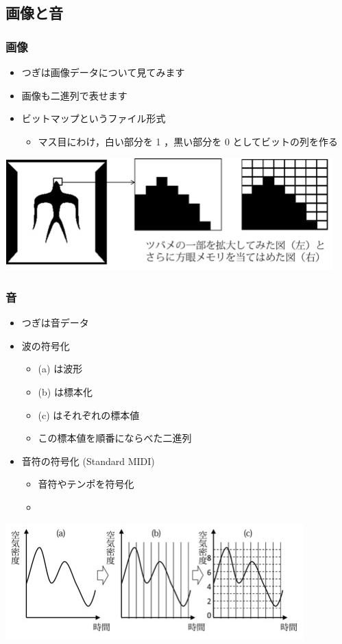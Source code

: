 \subsection{画像と音}
\begin{frame}
\frametitle{画像}
  \begin{itemize}
\item つぎは画像データについて見てみます
\item 画像も二進列で表せます
\item ビットマップというファイル形式
    \begin{itemize}
\item マス目にわけ，白い部分を 1 ，黒い部分を 0 としてビットの列を作る
    \end{itemize}
  \end{itemize}
\centering
\includegraphics[scale=0.4]{./Figure/TITECH-logo.jpg}
\end{frame}
\begin{frame}
\frametitle{音}
  \begin{itemize}
\item つぎは音データ
\item 波の符号化
    \begin{itemize}
\item (a) は波形
\item (b) は標本化
\item (c) はそれぞれの標本値
\item この標本値を順番にならべた二進列
    \end{itemize}
\item 音符の符号化 (Standard MIDI)
    \begin{itemize}
\item 音符やテンポを符号化
\item {}
    \end{itemize}
  \end{itemize}
  \begin{center}
\includegraphics[scale=0.4]{./Figure/wave.jpg}
  \end{center}
\end{frame}
